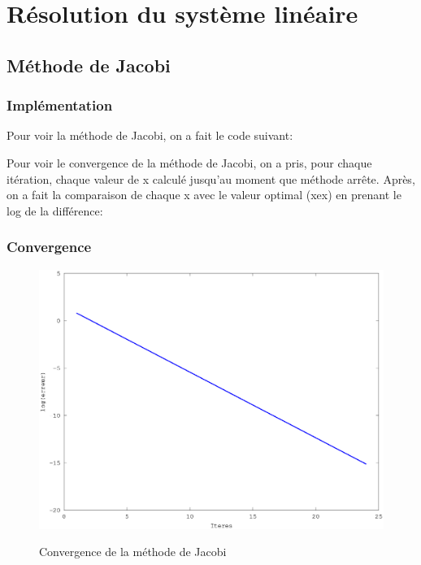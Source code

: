 \documentclass[a4paper,11pt]{article}
\begin{document}
\titleTMB 
\newpage
\tableofcontents
\listoffigures
\newpage

\section{Résolution du système linéaire}

\subsection{Méthode de Jacobi}
\subsubsection{Implémentation}

Pour voir la méthode de Jacobi, on a fait le code suivant:

\begin{multicols}{2}
  
\end{multicols}

\newpage

Pour  voir le  convergence  de la  méthode de  Jacobi,  on a  pris, pour  chaque
itération, chaque valeur de x
calculé jusqu'au moment que méthode arrête. Après, on a fait la comparaison de
chaque x avec le valeur optimal (xex) en prenant le log de la différence:

\subsubsection{Convergence}
\begin{figure}[h!]
  \begin{centering}
    \includegraphics[scale=0.5]{../jacobi_graph}
    \label{rspro2}
    \par\end{centering}
  \caption{Convergence de la méthode de Jacobi}
  \label{fig:jacobi-conv}
\end{figure}
\end{document}

